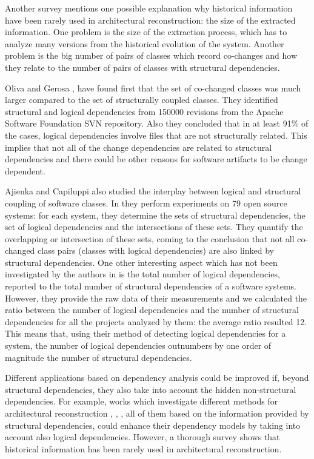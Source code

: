 Another survey \cite{Shtern:2012:CMS:2332427.2332428} mentions one possible explanation why historical information have been rarely used in architectural reconstruction: the size of the extracted information. One problem is the size of the extraction process, which has to analyze many versions from the historical evolution of the system. Another problem is the big number of pairs of classes which record co-changes and how they relate to the number of pairs of classes with structural dependencies.


Oliva and Gerosa \cite{Oliva:2011:ISL:2067853.2068086}, \cite{DBLP:conf/issre/OlivaG15} have found first that the set of co-changed classes was much larger compared to the set of structurally coupled classes. They identified structural and logical dependencies from 150000 revisions from the Apache Software Foundation SVN repository. Also they concluded  that in at least 91\% of the cases, logical dependencies involve files that are not structurally related. This implies that not all of the change dependencies are related to structural dependencies and there could be other reasons for software artifacts to be change dependent.

Ajienka and Capiluppi also studied the interplay between logical and structural coupling of software classes. In \cite{DBLP:journals/jss/AjienkaC17} they  perform experiments on 79 open source systems: for each system, they determine the sets of structural dependencies, the set of logical dependencies and the intersections of these sets. They quantify the overlapping or intersection of these sets, coming to the conclusion that not all co-changed class pairs (classes with logical dependencies) are also linked by structural dependencies. One other interesting aspect which has not been investigated by the authors in \cite{DBLP:journals/jss/AjienkaC17, DBLP:journals/ese/AjienkaCC18}  is the total number of logical dependencies, reported to the total number of structural dependencies of a software systems. However, they provide the raw data of their measurements and we calculated the ratio between the number of logical dependencies and the number of structural dependencies for all the projects analyzed by them: the average ratio resulted 12.  This means that, using their method of detecting logical dependencies for a system, the number of logical dependencies outnumbers by one order of magnitude the number of structural dependencies.

Different applications based on dependency analysis could be improved if, beyond structural dependencies, they also take into account the hidden non-structural dependencies. For example, works  which investigate different methods for architectural reconstruction \cite{SoraConti}, \cite{SoraSem13}, \cite{PagerankENASE},  all of them based on the information provided by structural dependencies, could enhance their dependency models by taking into account also logical dependencies. However, a thorough survey \cite{sar} shows that historical information has been rarely used in architectural reconstruction. 



